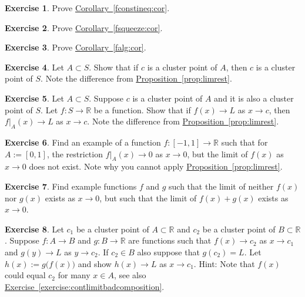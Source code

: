 \documentclass[12pt]{book}
\newcommand{\R}{{\mathbb{R}}}
\theoremstyle{plain}
\theoremstyle{remark}
\theoremstyle{definition}
\theoremstyle{exercise}
\newtheorem{exercise}{Exercise}[section]
\theoremstyle{example}
\newcommand{\exerciseref}[1]{\hyperref[#1]{Exercise~\ref*{#1}}}
\newcommand{\propref}[1]{\hyperref[#1]{Proposition~\ref*{#1}}}
\newcommand{\corref}[1]{\hyperref[#1]{Corollary~\ref*{#1}}}
\begin{document}
\begin{exercise}
Prove \corref{fconstineq:cor}.
\end{exercise}

\begin{exercise}
Prove \corref{fsqueeze:cor}.
\end{exercise}

\begin{exercise}
Prove \corref{falg:cor}.
\end{exercise}

\begin{exercise}
Let $A \subset S$.  Show that if $c$ is a cluster point of $A$, then $c$
is a cluster point of $S$.  Note the difference from
\propref{prop:limrest}.
\end{exercise}

\begin{exercise} \label{exercise:restrictionlimitexercise}
Let $A \subset S$.  Suppose $c$ is a cluster point of $A$ and
it is also a cluster point of $S$.
Let $f \colon S \to \R$ be a function.  Show that if
$f(x) \to L$ as $x \to c$, then
$f|_A(x) \to L$ as $x \to c$.
Note the difference from
\propref{prop:limrest}.
\end{exercise}

\begin{exercise}
Find an example of a function $f \colon [-1,1] \to \R$ such that
for $A:=[0,1]$, the restriction
$f|_A(x) \to 0$ as $x \to 0$, but the limit of $f(x)$ as $x \to 0$
does not exist.  Note why you cannot apply
\propref{prop:limrest}.
\end{exercise}

\begin{exercise}
Find example functions $f$ and $g$ such that the limit of neither $f(x)$
nor $g(x)$ exists as $x \to 0$, but such that the limit of $f(x)+g(x)$ exists
as $x \to 0$.
\end{exercise}

\begin{exercise} \label{exercise:contlimitcomposition}
Let $c_1$ be a cluster point of $A \subset \R$ and $c_2$ be
a cluster point of $B \subset \R$.  Suppose 
$f \colon A \to B$ and $g \colon B \to \R$ are functions
such that
$f(x) \to c_2$ as $x \to c_1$ and
$g(y) \to L$ as $y \to c_2$.  If $c_2 \in B$ also suppose that $g(c_2) = L$.  Let $h(x) := g\bigl(f(x)\bigr)$ and show
$h(x) \to L$ as $x \to c_1$.
Hint: Note that $f(x)$ could equal $c_2$ for many $x \in A$,
see also
\exerciseref{exercise:contlimitbadcomposition}.
\end{exercise}
\end{document}
